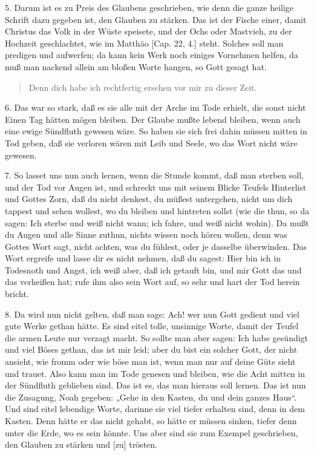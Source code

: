 5. Darum ist es zu Preis des Glaubens geschrieben, wie denn die ganze heilige Schrift dazu gegeben ist, den Glauben zu stärken. Das ist der Fische einer, damit Christus das Volk in der Wüste speisete, und der Ochs oder Mastvieh, zu der Hochzeit geschlachtet, wie im Matthäo [Cap. 22, 4.] steht. Solches soll man predigen und aufwerfen; da kann kein Werk noch einiges Vornehmen helfen, da muß man nackend allein am bloßen Worte hangen, so Gott gesagt hat.

\begin{quote}
Denn dich habe ich rechtfertig ersehen vor mir zu dieser Zeit.
\end{quote}

6. Das war so stark, daß es sie alle mit der Arche im Tode erhielt, die sonst nicht Einen Tag hätten mögen bleiben. Der Glaube mußte lebend bleiben, wenn auch eine ewige Sündfluth gewesen wäre. So haben sie sich frei dahin müssen mitten in Tod geben, daß sie verloren wären mit Leib und Seele, wo das Wort nicht wäre gewesen.

7. So lasset uns nun auch lernen, wenn die Stunde kommt, daß man sterben soll, und der Tod vor Augen ist, und schreckt uns mit seinem Blicke Teufels Hinterlist und Gottes Zorn, daß du nicht denkest, du müßest untergehen, nicht um dich tappest und sehen wollest, wo du bleiben und hintreten sollst (wie die thun, so da sagen: Ich sterbe und weiß nicht wann; ich fahre, und weiß
nicht wohin). Da mußt du Augen und alle Sinne zuthun, nichts wissen noch hören wollen, denn was Gottes Wort sagt, nicht achten, was du fühlest, oder je dasselbe überwinden. Das Wort ergreife und lasse dir es nicht nehmen, daß du sagest: Hier bin ich in Todesnoth und Angst, ich weiß aber, daß ich getauft bin, und mir Gott das und das verheißen hat; rufe ihm also sein Wort auf, so sehr und hart der Tod herein bricht.

8. Da wird nun nicht gelten, daß man sage: Ach! wer nun Gott gedient und viel gute Werke gethan hätte. Es sind eitel tolle, unsinnige Worte, damit der Teufel die armen Leute nur verzagt macht. So sollte man aber sagen: Ich habe gesündigt und viel Böses gethan, das ist mir leid; aber du bist ein solcher Gott, der nicht ansieht, wie fromm oder wie böse man ist, wenn man nur auf deine Güte sieht und trauet. Also kann man im Tode genesen und bleiben, wie die Acht mitten in der Sündfluth geblieben sind. Das ist es, das man hieraus soll lernen. Das ist nun die Zusagung, Noah gegeben: „Gehe in den Kasten, du und dein ganzes Haus“. Und sind eitel lebendige Worte, darinne sie viel tiefer erhalten sind, denn in dem Kasten. Denn hätte er das nicht gehabt, so hätte er müssen sinken, tiefer denn unter die Erde, wo es sein könnte. Uns aber sind sie zum Exempel geschrieben, den Glauben zu stärken und [zu] trösten.

